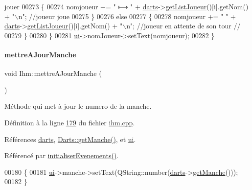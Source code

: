 \begin{DoxyCode}
{       jouer}
00273         \{
00274             nomjoueur += \textcolor{stringliteral}{"   ⟼ "} + \hyperlink{class_ihm_a2a0f54d33f4d6b2531ec2190c4a2356e}{darts}->\hyperlink{class_darts_a0525b09703d3461bf5570197354743c3}{getListJoueur}()[i].getNom() + \textcolor{stringliteral}{"\(\backslash\)n"};  \textcolor{comment}{//joueur
       joue}
00275         \}
00276         \textcolor{keywordflow}{else}
00277         \{
00278             nomjoueur += \textcolor{stringliteral}{"            "} + \hyperlink{class_ihm_a2a0f54d33f4d6b2531ec2190c4a2356e}{darts}->\hyperlink{class_darts_a0525b09703d3461bf5570197354743c3}{getListJoueur}()[i].getNom() + \textcolor{stringliteral}{"\(\backslash\)n"};     
        \textcolor{comment}{//joueur en attente de son tour //}
00279         \}
00280     \}
00281     \hyperlink{class_ihm_a0ac5f47856566ceeeca1720109bf70ea}{ui}->nomJoueur->setText(nomjoueur);
00282 \}
\end{DoxyCode}
\mbox{\label{class_ihm_a3b41d92919b87966f903b22863dc6acb}} 
\paragraph{\texorpdfstring{mettre\+A\+Jour\+Manche}{mettreAJourManche}}
{\footnotesize\ttfamily void Ihm\+::mettre\+A\+Jour\+Manche (\begin{DoxyParamCaption}{ }\end{DoxyParamCaption})\hspace{0.3cm}{\ttfamily [slot]}}



Méthode qui met à jour le numero de la manche. 



Définition à la ligne \hyperlink{ihm_8cpp_source_l00179}{179} du fichier \hyperlink{ihm_8cpp_source}{ihm.\+cpp}.



Références \hyperlink{ihm_8h_source_l00055}{darts}, \hyperlink{darts_8cpp_source_l00044}{Darts\+::get\+Manche()}, et \hyperlink{ihm_8h_source_l00052}{ui}.



Référencé par \hyperlink{ihm_8cpp_source_l00075}{initialiser\+Evenements()}.


\begin{DoxyCode}
00180 \{
00181     \hyperlink{class_ihm_a0ac5f47856566ceeeca1720109bf70ea}{ui}->manche->setText(QString::number(\hyperlink{class_ihm_a2a0f54d33f4d6b2531ec2190c4a2356e}{darts}->\hyperlink{class_darts_a2ce03c887d90f3a997648981d342b50c}{getManche}()));
00182 \}
\end{DoxyCode}
\mbox{\label{class_ihm_ab80e655c95fca8e1113343bdbd3d3586}} 
